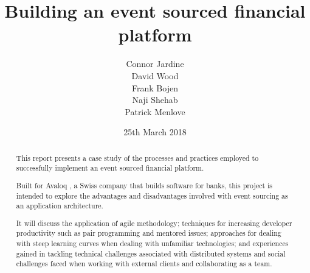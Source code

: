 \documentclass{l3proj}
\begin{document}
\title{Building an event sourced financial platform}
\author{Connor Jardine \\
        David Wood \\
        Frank Bojen \\
        Naji Shehab \\
        Patrick Menlove}
\date{25th March 2018}
\maketitle

\begin{abstract}
This report presents a case study of the processes and practices employed to successfully implement an event sourced financial platform.

Built for Avaloq \cite{avaloq}, a Swiss company that builds software for banks, this project is intended to explore the advantages and disadvantages involved with event sourcing as an application architecture.

It will discuss the application of agile methodology; techniques for increasing developer productivity such as pair programming and mentored issues; approaches for dealing with steep learning curves when dealing with unfamiliar technologies; and experiences gained in tackling technical challenges associated with distributed systems and social challenges faced when working with external clients and collaborating as a team.
\end{abstract}
\educationalconsent
\end{document}
